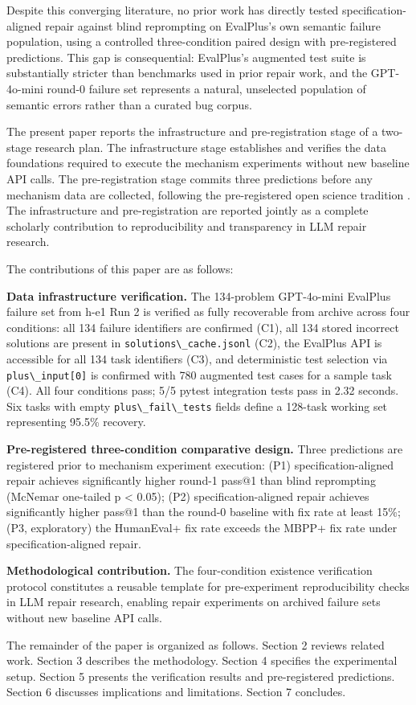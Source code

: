 Despite this converging literature, no prior work has directly tested specification-aligned repair against blind reprompting on EvalPlus's own semantic failure population, using a controlled three-condition paired design with pre-registered predictions. This gap is consequential: EvalPlus's augmented test suite is substantially stricter than benchmarks used in prior repair work, and the GPT-4o-mini round-0 failure set represents a natural, unselected population of semantic errors rather than a curated bug corpus.

The present paper reports the infrastructure and pre-registration stage of a two-stage research plan. The infrastructure stage establishes and verifies the data foundations required to execute the mechanism experiments without new baseline API calls. The pre-registration stage commits three predictions before any mechanism data are collected, following the pre-registered open science tradition \citep{Nosek2018}. The infrastructure and pre-registration are reported jointly as a complete scholarly contribution to reproducibility and transparency in LLM repair research.

The contributions of this paper are as follows:

\textbf{Data infrastructure verification.} The 134-problem GPT-4o-mini EvalPlus failure set from h-e1 Run 2 is verified as fully recoverable from archive across four conditions: all 134 failure identifiers are confirmed (C1), all 134 stored incorrect solutions are present in \texttt{solutions\textbackslash \_cache.jsonl} (C2), the EvalPlus API is accessible for all 134 task identifiers (C3), and deterministic test selection via \texttt{plus\textbackslash \_input[0]} is confirmed with 780 augmented test cases for a sample task (C4). All four conditions pass; 5/5 pytest integration tests pass in 2.32 seconds. Six tasks with empty \texttt{plus\textbackslash \_fail\textbackslash \_tests} fields define a 128-task working set representing 95.5\% recovery.

\textbf{Pre-registered three-condition comparative design.} Three predictions are registered prior to mechanism experiment execution: (P1) specification-aligned repair achieves significantly higher round-1 pass@1 than blind reprompting (McNemar one-tailed p < 0.05); (P2) specification-aligned repair achieves significantly higher pass@1 than the round-0 baseline with fix rate at least 15\%; (P3, exploratory) the HumanEval+ fix rate exceeds the MBPP+ fix rate under specification-aligned repair.

\textbf{Methodological contribution.} The four-condition existence verification protocol constitutes a reusable template for pre-experiment reproducibility checks in LLM repair research, enabling repair experiments on archived failure sets without new baseline API calls.

The remainder of the paper is organized as follows. Section 2 reviews related work. Section 3 describes the methodology. Section 4 specifies the experimental setup. Section 5 presents the verification results and pre-registered predictions. Section 6 discusses implications and limitations. Section 7 concludes.

